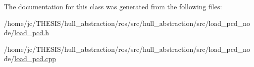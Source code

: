 The documentation for this class was generated from the following files\+:\begin{DoxyCompactItemize}
\item 
/home/jc/\+T\+H\+E\+S\+I\+S/hull\+\_\+abstraction/ros/src/hull\+\_\+abstraction/src/load\+\_\+pcd\+\_\+node/\hyperlink{load__pcd_8h}{load\+\_\+pcd.\+h}\item 
/home/jc/\+T\+H\+E\+S\+I\+S/hull\+\_\+abstraction/ros/src/hull\+\_\+abstraction/src/load\+\_\+pcd\+\_\+node/\hyperlink{load__pcd_8cpp}{load\+\_\+pcd.\+cpp}\end{DoxyCompactItemize}
